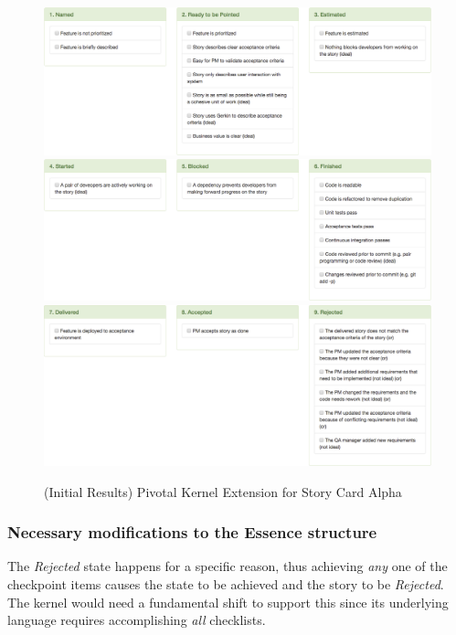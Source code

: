 \documentclass[preprint,12pt,3p]{elsarticle}
\begin{document}
\begin{figure}[ht]
\includegraphics[width=6.25in]{pivotal_images/story_card1}
\includegraphics[width=6.25in]{pivotal_images/story_card2}
\includegraphics[width=6.25in]{pivotal_images/story_card3}
\caption{(Initial Results) Pivotal Kernel Extension for Story Card Alpha}
\label{KernelExtension}
\end{figure}

\subsubsection{Necessary modifications to the Essence structure}

The \textit{Rejected} state happens for a specific reason, thus achieving \textit{any} one of the checkpoint items causes the state to be achieved and the story to be \textit{Rejected}. The kernel would need a fundamental shift to support this since its underlying language requires accomplishing \textit{all} checklists. 
\end{document}
